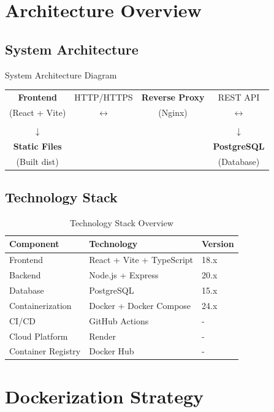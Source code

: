 \documentclass[12pt]{article}
\begin{document}
\section{Architecture Overview}

\subsection{System Architecture}

\begin{infobox}{System Architecture Diagram}
\begin{center}
\begin{tabular}{cccc}
\textbf{Frontend} & HTTP/HTTPS & \textbf{Reverse Proxy} & REST API \\
(React + Vite) & $\leftrightarrow$ & (Nginx) & $\leftrightarrow$ \\
& & & \\
$\downarrow$ & & & $\downarrow$ \\
\textbf{Static Files} & & & \textbf{PostgreSQL} \\
(Built dist) & & & (Database) \\
\end{tabular}
\end{center}
\end{infobox}

\subsection{Technology Stack}
\begin{table}[ht!]
\centering
\begin{tabular}{|l|l|l|}
\hline
\rowcolor{lightblue}
\textbf{Component} & \textbf{Technology} & \textbf{Version} \\
\hline
Frontend & React + Vite + TypeScript & 18.x \\
Backend & Node.js + Express & 20.x \\
Database & PostgreSQL & 15.x \\
Containerization & Docker + Docker Compose & 24.x \\
CI/CD & GitHub Actions & - \\
Cloud Platform & Render & - \\
Container Registry & Docker Hub & - \\
\hline
\end{tabular}
\caption{Technology Stack Overview}
\end{table}

\section{Dockerization Strategy}
\end{document}

